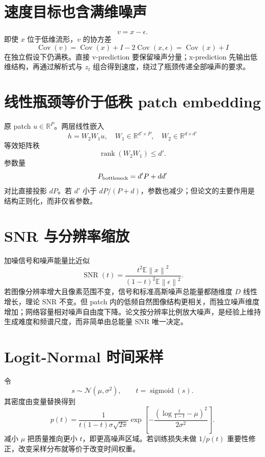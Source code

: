 \documentclass[UTF8,12pt,a4paper,fontset=none]{ctexart}
\numberwithin{equation}{section}
\newcommand{\R}{\mathbb{R}}
\newcommand{\E}{\mathbb{E}}
\newcommand{\norm}[1]{\left\lVert #1\right\rVert}
\newcommand{\rank}{\operatorname{rank}}
\begin{document}
\section{速度目标也含满维噪声}
\begin{equation}
 v=x-\epsilon.
\end{equation}
即使 $x$ 位于低维流形，$v$ 的协方差
\begin{equation}
 \operatorname{Cov}(v)=\operatorname{Cov}(x)+I-2\operatorname{Cov}(x,\epsilon)
 =\operatorname{Cov}(x)+I
\end{equation}
在独立假设下仍满秩。直接 v-prediction 要保留噪声分量；x-prediction 先输出低维结构，再通过解析式与 $z_t$ 组合得到速度，绕过了瓶颈传递全部噪声的要求。

\section{线性瓶颈等价于低秩 patch embedding}
原 patch $u\in\R^P$。两层线性嵌入
\begin{equation}
 h=W_2W_1u,
 \quad W_1\in\R^{d'\times P},\quad W_2\in\R^{d\times d'}
\end{equation}
等效矩阵秩
\begin{equation}
 \rank(W_2W_1)\le d'.
\end{equation}
参数量
\begin{equation}
 P_{\rm bottleneck}=d'P+dd'
\end{equation}
对比直接投影 $dP$。若 $d'$ 小于 $dP/(P+d)$，参数也减少；但论文的主要作用是结构正则化，而非仅省参数。

\section{SNR 与分辨率缩放}
加噪信号和噪声能量比近似
\begin{equation}
 \operatorname{SNR}(t)=\frac{t^2\E\norm{x}^2}{(1-t)^2\E\norm{\epsilon}^2}.
\end{equation}
若图像分辨率增大且像素范围不变，信号和标准高斯噪声总能量都随维度 $D$ 线性增长，理论 SNR 不变。但 patch 内的低频自然图像结构更相关，而独立噪声维度增加；网络容量相对噪声自由度下降。论文按分辨率比例放大噪声，是经验上维持生成难度和频谱尺度，而非简单由总能量 SNR 唯一决定。

\section{Logit-Normal 时间采样}
令
\begin{equation}
 s\sim\mathcal N(\mu,\sigma^2),\qquad t=\operatorname{sigmoid}(s).
\end{equation}
其密度由变量替换得到
\begin{equation}
 p(t)=\frac{1}{t(1-t)\sigma\sqrt{2\pi}}
 \exp\left[-\frac{(\log\frac{t}{1-t}-\mu)^2}{2\sigma^2}\right].
\end{equation}
减小 $\mu$ 把质量推向更小 $t$，即更高噪声区域。若训练损失未做 $1/p(t)$ 重要性修正，改变采样分布就等价于改变时间权重。
\end{document}
